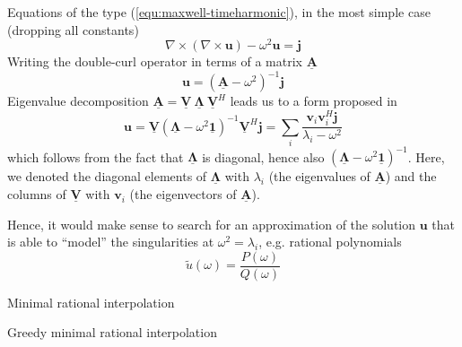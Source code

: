 \documentclass[11pt, a4paper]{article}
\begin{document}
Equations of the type (\ref{equ:maxwell-timeharmonic}), in the most simple case (dropping
all constants)
\begin{equation}
    \nabla \times (\nabla \times \mathbf{u}) - \omega^2 \mathbf{u} = \mathbf{j}
\end{equation}
Writing the double-curl operator in terms of a matrix $\mathbf{\underline{A}}$
\begin{equation}
    \mathbf{u} = (\mathbf{\underline{A}} - \omega^2)^{-1} \mathbf{j}
\end{equation}
Eigenvalue decomposition $\mathbf{\underline{A}} = \mathbf{\underline{V}} ~ \boldsymbol{\underline{\Lambda}} ~ \mathbf{\underline{V}}^H$
leads us to a form proposed in \cite{helmholtz-motivation}
\begin{equation}
    \mathbf{u} = \mathbf{\underline{V}} (\boldsymbol{\underline{\Lambda}} - \omega^2 \boldsymbol{\underline{1}})^{-1} \mathbf{\underline{V}}^H \mathbf{j} 
    = \sum_i \frac{\mathbf{v}_i \mathbf{v}_i^H \mathbf{j}}{\lambda_i - \omega^2} \label{equ:motivation}
\end{equation}
which follows from the fact that $\boldsymbol{\underline{\Lambda}}$ is diagonal,
hence also $(\boldsymbol{\underline{\Lambda}} - \omega^2 \boldsymbol{\underline{1}})^{-1}$.
Here, we denoted the diagonal elements of $\boldsymbol{\underline{\Lambda}}$ with 
$\lambda_i$ (the eigenvalues of $\mathbf{\underline{A}}$) and the columns of
$\mathbf{\underline{V}}$ with $\mathbf{v}_i$ (the eigenvectors of $\mathbf{\underline{A}}$).

Hence, it would make sense to search for an approximation of the solution $\mathbf{u}$
that is able to \enquote{model} the singularities at $\omega^2 = \lambda_i$, e.g.
rational polynomials
\begin{equation}
    \tilde{u}(\omega) = \frac{P(\omega)}{Q(\omega)}
\end{equation}

\citep{greedyMRI}

\begin{algorithm}
    \caption{Minimal rational interpolation} \label{alg:MRI}
    
\end{algorithm}

\citep{shortMRI}

\begin{algorithm}
    \caption{Greedy minimal rational interpolation} \label{alg:gMRI}
    
\end{algorithm}
\end{document}
